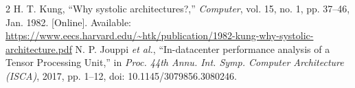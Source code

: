 \documentclass[conference]{IEEEtran}
\begin{document}
\begin{thebibliography}{2}
 H. T. Kung, ``Why systolic architectures?,'' \emph{Computer}, vol. 15, no. 1, pp. 37--46, Jan. 1982. [Online]. Available: \url{https://www.eecs.harvard.edu/~htk/publication/1982-kung-why-systolic-architecture.pdf}
 N. P. Jouppi \emph{et al.}, ``In-datacenter performance analysis of a Tensor Processing Unit,'' in \emph{Proc. 44th Annu. Int. Symp. Computer Architecture (ISCA)}, 2017, pp. 1--12, doi: 10.1145/3079856.3080246.
\end{thebibliography}
\end{document}
